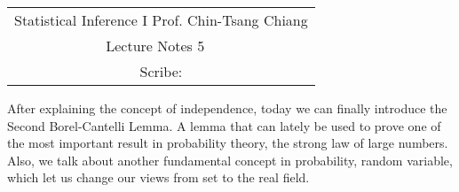 \documentclass[Probability_Theory.tex]{subfiles}
\begin{document}
	\begin{center}
		\renewcommand{\arraystretch}{2}
		\begin{bfseries}
			\begin{tabular}{|c|}
				\hline
				Statistical Inference I \hfill Prof. Chin-Tsang Chiang\\
				\hspace{15em} {\large Lecture Notes 5} \hspace{15em}\ \\
				\lecdate \hfill Scribe: \scribe\\
				\hline
			\end{tabular}
			\renewcommand{\arraystretch}{1}
		\end{bfseries}
	\end{center}

After explaining the concept of independence, today we can finally introduce the Second Borel-Cantelli Lemma. A lemma that can lately be used to prove one of the most important result in probability theory, the strong law of large numbers. Also, we talk about another fundamental concept in probability, random variable, which let us change our views from set to the real field.   
\end{document}
